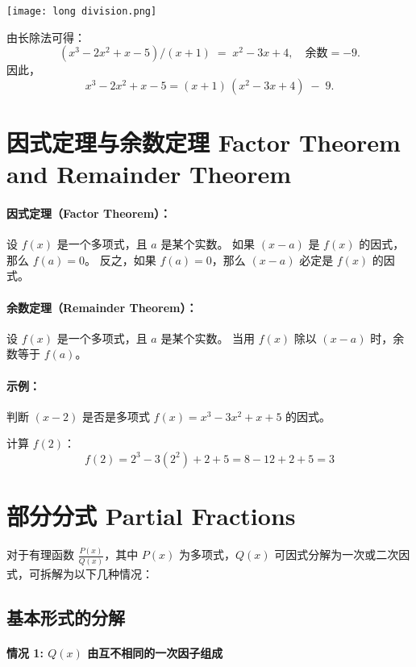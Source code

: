 \documentclass[8pt,a4paper,twoside]{tau-class/tau}
\begin{document}
\begin{tcolorbox}[enhanced, breakable, boxsep=1pt, colframe=blue!50!black, colback=white, fonttitle=\footnotesize, fontupper=\footnotesize, title=长除法示意]
\centering
\texttt{[image: long division.png]}
\end{tcolorbox}

由长除法可得：
\[
    (x^3 − 2x^2 + x − 5)/(x + 1)\;=\; x^2 − 3x + 4, 
    \quad \text{余数} = −9.
\]
因此，
\[
    x^3 − 2x^2 + x − 5 
    = (x + 1)\,(x^2 − 3x + 4)\;−\;9.
\]
\section{因式定理与余数定理 Factor Theorem and Remainder Theorem}

\paragraph{因式定理（Factor Theorem）：}
设 $f(x)$ 是一个多项式，且 $a$ 是某个实数。
如果 $(x − a)$ 是 $f(x)$ 的因式，那么 $f(a) = 0$。
反之，如果 $f(a) = 0$，那么 $(x − a)$ 必定是 $f(x)$ 的因式。

\paragraph{余数定理（Remainder Theorem）：}
设 $f(x)$ 是一个多项式，且 $a$ 是某个实数。
当用 $f(x)$ 除以 $(x−a)$ 时，余数等于 $f(a)$。

\paragraph{示例：}
判断 $(x − 2)$ 是否是多项式 $f(x) = x^3  −  3x^2 + x + 5$ 的因式。

计算 $f(2)$：
\[
f(2) = 2^3  −  3(2^2) + 2 + 5 = 8  −  12 + 2 + 5 = 3
\]


\section{部分分式 Partial Fractions}

对于有理函数 $\frac{P(x)}{Q(x)}$，其中 $P(x)$ 为多项式，$Q(x)$ 可因式分解为一次或二次因式，可拆解为以下几种情况：

\subsection{基本形式的分解}

\paragraph{情况 1: $Q(x)$ 由互不相同的一次因子组成}
\end{document}
